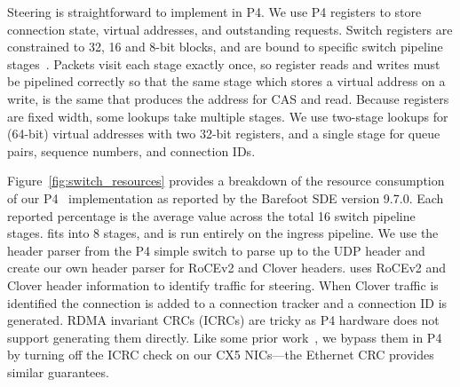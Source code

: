 Steering is straightforward to implement in P4. We use P4 registers to
store connection state, virtual addresses, and outstanding
requests. Switch registers are constrained to 32, 16 and 8-bit blocks,
and are bound to specific switch pipeline
stages~\cite{netcache}. Packets visit each stage exactly once, so
register reads and writes must be pipelined correctly so that the same
stage which stores a virtual address on a write, is the same that
produces the address for CAS and read. Because registers are fixed
width, some lookups take multiple stages.  We use two-stage lookups
for (64-bit) virtual addresses with two 32-bit registers, and a single
stage for queue pairs, sequence numbers, and connection IDs.

Figure~\ref{fig:switch_resources} provides a breakdown of the resource
consumption of our P4 \sword\ implementation as reported by
the Barefoot SDE version 9.7.0. Each
reported percentage is the average value across the total 16 switch
pipeline stages. {\sword} fits into 8 stages, and is run entirely on
the ingress pipeline.
We use the header parser from the P4 simple switch to parse up to the
UDP header and create our own header parser for RoCEv2 and Clover
headers.  {\sword} uses RoCEv2 and Clover header information to
identify traffic for steering. When Clover traffic is identified the
connection is added to a connection tracker and a connection ID is
generated. RDMA invariant CRCs (ICRCs) are tricky as P4 hardware does
not support generating them directly. Like some prior
work~\cite{switchml}, we bypass them in P4 by turning off the ICRC
check on our CX5 NICs---the Ethernet CRC provides similar guarantees.


